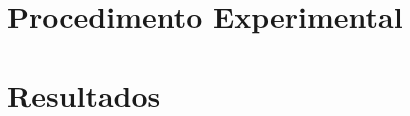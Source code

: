 \documentclass[
	12pt,				%
	openright,			%
	twoside,			%
	a4paper,			%
	english,			%
	brazil,				%
	]{abntex2}
\begin{document}
\part{Procedimento Experimental}

%
%

% 

%

\part{Resultados}

%
\end{document}
